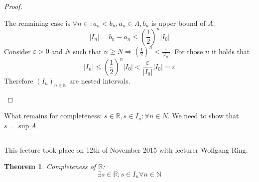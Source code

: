 \documentclass[a4paper,landscape,twocolumn]{article}
\newtheorem{theorem}{Theorem}
\newcommand\abs[1]{\left|#1\right|}
\newcommand\meta[3]{\hrule{} This #1 took place on #2 with lecturer #3.\par}
\begin{document}
\begin{proof}
\begin{description}
\begin{description}
          The remaining case is $\forall n \in \mathbb: a_n < b_n, a_n \in A, b_n$
          is upper bound of $A$.
          \[ \abs{I_n} = b_n - a_n \leq \left(\frac12\right)^n \abs{I_0} \]
          Consider $\varepsilon > 0$ and $N$ such that $n \geq N \Rightarrow
          \left(\frac12\right)^n < \frac{\varepsilon}{\abs{I_n}}$.
          For those $n$ it holds that
          \[ \abs{I_n} \leq \left(\frac12\right)^n \abs{I_0} < \frac{\varepsilon}{\abs{I_0}} \abs{I_0} = \varepsilon \]
          Therefore $(I_n)_{n \in \mathbb N}$ are nested intervals.
      \end{description}
  \end{description}
\end{proof}

What remains for completeness:
  $s \in \mathbb R, s \in I_n: \forall n \in N$.
  We need to show that $s = \sup{A}$.

\meta{lecture}{12th of November 2015}{Wolfgang Ring}

\begin{theorem}
  Completeness of $\mathbb{R}$:
  \[ \exists s \in \mathbb R: s \in I_n \forall n \in \mathbb N \]
\end{theorem}
\end{document}
